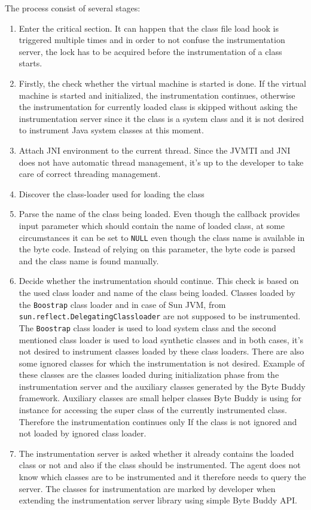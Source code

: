The process consist of several stages:
\begin{enumerate}
	
	\item Enter the critical section. It can happen that the class file load hook is triggered multiple times and in order to not confuse the instrumentation server, the lock has to be acquired before the instrumentation of a class starts.
	\item Firstly, the check whether the virtual machine is started is done. If the virtual machine is started and initialized, the instrumentation continues, otherwise the instrumentation for currently loaded class is skipped without asking the instrumentation server since it the class is a system class and it is not desired to instrument Java system classes at this moment.
	\item Attach JNI environment to the current thread. Since the JVMTI and JNI does not have automatic thread management, it's up to the developer to take care of correct threading management.
	\item Discover the class-loader used for loading the class
	\item Parse the name of the class being loaded. Even though the callback provides input parameter which should contain the name of loaded class, at some circumstances it can be set to \texttt{NULL} even though the class name is available in the byte code. Instead of relying on this parameter, the byte code is parsed and the class name is found manually.
	\item Decide whether the instrumentation should continue. This check is based on the used class loader and name of the class being loaded. Classes loaded by the \texttt{Boostrap} class loader and in case of Sun JVM, from \texttt{sun.reflect.DelegatingClassloader} are not supposed to be instrumented. 
	The \texttt{Boostrap} class loader is used to load system class and the second mentioned class loader is used to load synthetic classes and in both cases, it's not desired to instrument classes loaded by these class loaders.
	There are also some ignored classes for which the instrumentation is not desired. Example of these classes are the classes loaded during initialization phase from the instrumentation server and the auxiliary classes generated by the Byte Buddy framework. Auxiliary classes are small helper classes Byte Buddy is using for instance for accessing the super class of the currently instrumented class. Therefore the instrumentation continues only If the class is not ignored and not loaded by ignored class loader.
	\item The instrumentation server is asked whether it already contains the loaded class or not and also if the class should be instrumented. The agent does not know which classes are to be instrumented and it therefore needs to query the server. The classes for instrumentation are marked by developer when extending the instrumentation server library using simple Byte Buddy API. 
	

\end{enumerate}
